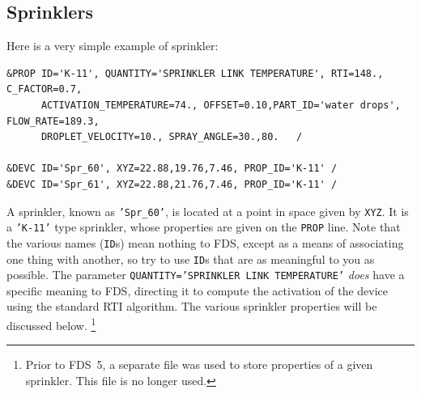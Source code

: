 \documentclass[11pt]{book}
\newcommand{\ct}{\tt\small}
\begin{document}
\subsection{Sprinklers}
\label{info:sprinklers}

Here is a very simple example of sprinkler:

\footnotesize
\begin{verbatim}
&PROP ID='K-11', QUANTITY='SPRINKLER LINK TEMPERATURE', RTI=148., C_FACTOR=0.7,
      ACTIVATION_TEMPERATURE=74., OFFSET=0.10,PART_ID='water drops', FLOW_RATE=189.3,
      DROPLET_VELOCITY=10., SPRAY_ANGLE=30.,80.   /

&DEVC ID='Spr_60', XYZ=22.88,19.76,7.46, PROP_ID='K-11' /
&DEVC ID='Spr_61', XYZ=22.88,21.76,7.46, PROP_ID='K-11' /
\end{verbatim} \normalsize

\noindent
A sprinkler, known as {\ct 'Spr\_60'}, is located at a point in space given by {\ct XYZ}. It is a {\ct 'K-11'} type sprinkler, whose properties
are given on the {\ct PROP} line. Note that the various names ({\ct ID}s) mean nothing to FDS, except as a means of associating one thing with
another, so try to use {\ct ID}s that are as meaningful to you as possible.  The parameter {\ct QUANTITY='SPRINKLER LINK TEMPERATURE'} {\em does}
have a specific meaning to FDS, directing it to compute the activation of
the device using the standard RTI algorithm. The various sprinkler properties will be discussed below.
\footnote{Prior to FDS~5, a separate file was used to store
properties of a given sprinkler. This file is no longer used.}
\end{document}

